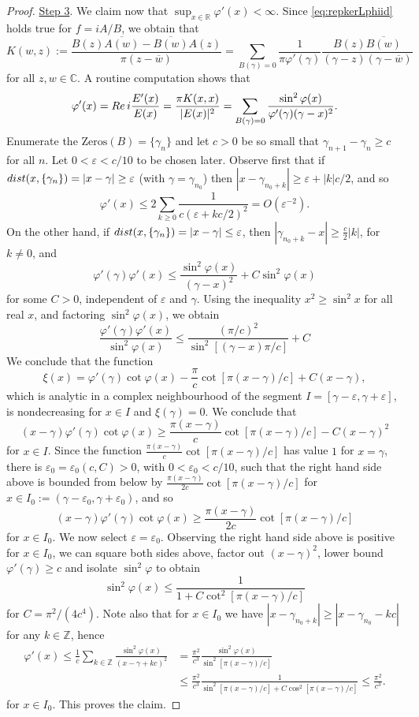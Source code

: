 \documentclass[a4paper,reqno,12pt]{amsart}
\newcommand{\z}{\mathbb{Z}}
\renewcommand{\r}{\mathbb{R}}
\newcommand{\cp}{\mathbb{C}} %
\newcommand{\re}{{\rm Re}\,}
\newcommand{\ga}{\gamma}
\newcommand{\ep}{\varepsilon}
\newcommand{\p}{\varphi}
\newcommand{\w}{\ov{w}}
\newcommand{\1}{{\bf 1}}
\newcommand{\ov}[1]{\overline{#1}}
\renewcommand{\1}{{\bo 1}}
\begin{document}
\begin{proof}
\underline{Step 3}. We claim now that $\sup_{x\in \r} \p'(x)<\infty$. Since \eqref{eq:repkerLphiid} holds true for $f=iA/B$, we obtain that
$$
K(w,z):=\frac{B(z)\ov{A(w)}-\ov{B(w)}{A(z)}}{\pi(z-\w)} = \sum_{B(\ga)=0} \frac{1}{\pi\p'(\ga)} \frac{B(z)\ov{B(w)}}{(\ga-z)(\ga-\w)}
$$
for all $z,w\in\cp$.  A routine computation shows that
$$
\p'(x) = \re i \frac{E'(x)}{E(x)} =  \frac{\pi K(x,x)}{|E(x)|^2} = \sum_{B(\ga)=0} \frac{\sin^2 \p(x)}{\p'(\ga)(\ga-x)^2}.
$$
Enumerate the $\text{Zeros}(B)=\{\ga_n\}$ and let $c>0$ be so small that $\ga_{n+1}-\ga_n\geq c$ for all $n$. Let $0<\ep<c/10$ to be chosen later.  Observe first that if ${\rm dist}(x,\{\ga_n\})=|x-\ga|\geq \ep$ (with $\ga=\ga_{n_0}$) then $|x-\ga_{n_0+k}| \geq \ep+|k|c/2$, and so
$$
\p'(x) \leq 2\sum_{k \geq 0} \frac{1}{c(\ep+kc/2)^2} = O(\ep^{-2}).
$$
On the other hand, if ${\rm dist}(x,\{\ga_n\})=|x-\ga|\leq \ep$, then $|\ga_{n_0+k}-x|\geq \frac{c}2|k|$, for $k\neq 0$, and 
$$
\p'(\ga)\p'(x) \leq  \frac{\sin^2 \p(x)}{(\ga-x)^2} + C\sin^2 \p(x)
 $$
 for some $C>0$, independent of $\ep$ and $\ga$. Using the inequality $x^2\geq \sin^2 x$ for all real $x$, and factoring $\sin^2 \p(x)$, we obtain
 $$
\frac{\p'(\ga)\p'(x)}{\sin^2 \p(x)} \leq \frac{ (\pi/c)^2}{\sin^2[(\ga-x)\pi/c]} + C
 $$
 We conclude that the function
 $$
\xi(x)= \p'(\ga)\cot \p(x) - \frac{\pi}{c}\cot[\pi(x-\ga)/c] + C(x-\ga),
 $$
 which is analytic in a complex neighbourhood of the segment $I=[\ga-\ep,\ga+\ep]$, is nondecreasing for $x\in I$ and $\xi(\ga)=0$. We conclude that 
 $$
 (x-\ga)\p'(\ga)\cot \p(x)  \geq \frac{\pi(x-\ga)}{c}\cot[\pi(x-\ga)/c] - C(x-\ga)^2
 $$
 for $x\in I$. Since the function $ \frac{\pi(x-\ga)}{c}\cot[\pi(x-\ga)/c]$ has value $1$ for $x=\ga$, there is $\ep_0=\ep_0(c,C)>0$, with $0<\ep_0<c/10$, such that the right hand side above is bounded from below by $ \frac{\pi(x-\ga)}{2c}\cot[\pi(x-\ga)/c]$
for $x\in I_0:=(\ga-\ep_0,\ga+\ep_0)$, and so
$$
 (x-\ga)\p'(\ga)\cot \p(x)  \geq \frac{\pi(x-\ga)}{2c}\cot[\pi(x-\ga)/c]
 $$
 for $x\in I_0$. We now select $\ep=\ep_0$. Observing the right hand side above is positive for $x\in I_0$, we can square both sides above, factor out $(x-\ga)^2$, lower bound $\p'(\ga)\geq c$ and isolate $\sin^2 \p $ to obtain
$$
\sin^2 \p(x) \leq \frac{1}{1+C\cot^2[\pi(x-\ga)/c]}
$$
for $C=\pi^2/(4c^4)$. Note also that for $x\in I_0$ we have $|x-\ga_{n_0+k}|\geq |x-\ga_{n_0}-kc|$ for any $k\in \z$, hence
\begin{align*}
\p'(x) \leq \frac{1}{c}\sum_{k\in \z}\frac{\sin^2 \p(x)}{(x-\ga+kc)^2} & =\frac{\pi^2}{c^3} \frac{\sin^2 \p(x)}{\sin^2[\pi(x-\ga)/c]} \\ &\leq  \frac{\pi^2}{c^3}\frac{1}{\sin^2[\pi(x-\ga)/c]+C\cos^2[\pi(x-\ga)/c]}  \leq \frac{\pi^2}{c^3}.
\end{align*}
for $x\in I_0$. This proves the claim.


\end{proof}
\end{document}
